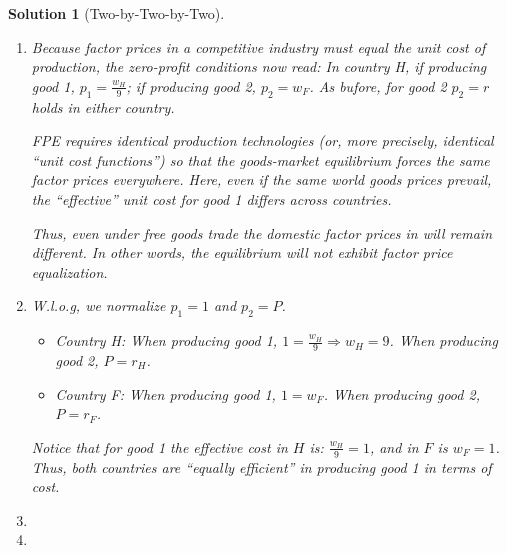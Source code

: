 \documentclass[a4paper,12pt]{article} %
\theoremstyle{nonitalic}
\newtheorem{solution}{Solution}
\begin{document}
\begin{solution}[Two-by-Two-by-Two]
\begin{enumerate}
        \item[4.] Because factor prices in a competitive industry must equal the unit cost of production, the zero-profit conditions now read:
        In country H, if producing good 1, $p_1 = \frac{w_H}{9}$; if producing good 2, $p_2 = w_F$. As bufore, for good 2 $p_2 = r$ holds in either country.
        
        FPE requires identical production technologies (or, more precisely, identical “unit cost functions”) 
        so that the goods-market equilibrium forces the same factor prices everywhere. Here, even if the same world goods prices prevail, 
        the “effective” unit cost for good 1 differs across countries.

        Thus, even under free goods trade the domestic factor prices in will remain different. 
        In other words, the equilibrium will not exhibit factor price equalization.

        \item[5.] W.l.o.g, we normalize $p_1 =1$ and $p_2 = P$.
            \begin{itemize}
                \item Country H: When producing good 1, $1 = \frac{w_H}{9} \Rightarrow w_H = 9$.
                    When producing good 2, $P = r_H$.
                \item Country F: When producing good 1, $1 = w_F$.
                    When producing good 2, $P = r_F$.
            \end{itemize}
            Notice that for good 1 the effective cost in $H$ is: $\frac{w_H}{9} = 1$, and in $F$ is $w_F = 1$.
            Thus, both countries are “equally efficient” in producing good 1 in terms of cost. 
        \item[6.]
        \item[7.]    
    \end{enumerate}
\end{solution}
\end{document}
